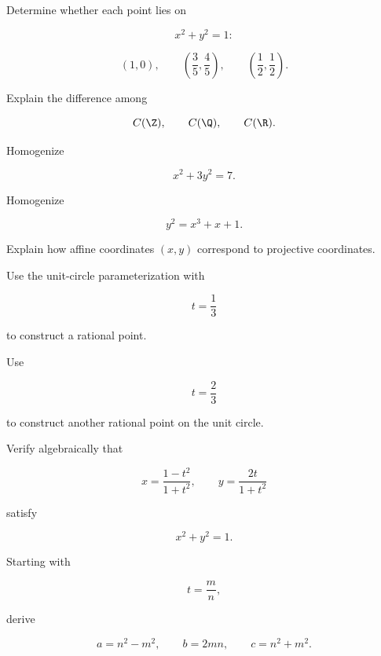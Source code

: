 \begin{exercise}[1]
Determine whether each point lies on

\[ x^2+y^2=1: \]

\[
(1,0),\qquad
\left(\frac35,\frac45\right),\qquad
\left(\frac12,\frac12\right).
\]
\end{exercise}

\begin{exercise}[1]
Explain the difference among

\[ C(\Z),\qquad C(\Q),\qquad C(\R). \]
\end{exercise}

\begin{exercise}[2]
Homogenize

\[ x^2+3y^2=7. \]
\end{exercise}

\begin{exercise}[2]
Homogenize

\[ y^2=x^3+x+1. \]
\end{exercise}

\begin{exercise}[2]
Explain how affine coordinates \((x,y)\) correspond to projective
coordinates.
\end{exercise}

\begin{exercise}[2]
Use the unit-circle parameterization with

\[ t=\frac13 \]

to construct a rational point.
\end{exercise}

\begin{exercise}[2]
Use

\[ t=\frac23 \]

to construct another rational point on the unit circle.
\end{exercise}

\begin{exercise}[2]
Verify algebraically that

\[
x=\frac{1-t^2}{1+t^2},
\qquad
y=\frac{2t}{1+t^2}
\]

satisfy

\[ x^2+y^2=1. \]
\end{exercise}

\begin{exercise}[2]
Starting with

\[ t=\frac mn, \]

derive

\[
a=n^2-m^2,\qquad
b=2mn,\qquad
c=n^2+m^2.
\]
\end{exercise}

